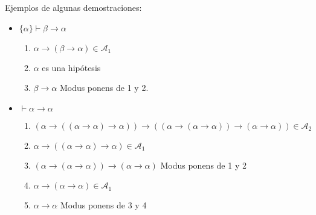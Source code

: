 \begin{ejemplo}
    Ejemplos de algunas demostraciones:
    \begin{itemize}
        \item $\{\alpha\}\vdash \beta\to\alpha$
            \begin{enumerate}
                \item $\alpha\to(\beta\to\alpha)\in \mathcal{A}_1$
                \item $\alpha$ es una hipótesis
                \item $\beta\to\alpha$ Modus ponens de 1 y 2.
            \end{enumerate}
        \item $\vdash \alpha\to\alpha$
            \begin{enumerate}
                \item $(\alpha\to((\alpha\to\alpha)\to\alpha))\to((\alpha\to(\alpha\to\alpha))\to(\alpha\to\alpha))\in \mathcal{A}_2$
                \item $\alpha\to((\alpha\to\alpha)\to\alpha)\in \mathcal{A}_1$
                \item $(\alpha\to(\alpha\to\alpha))\to(\alpha\to\alpha)$ Modus ponens de 1 y 2
                \item $\alpha\to(\alpha\to\alpha)\in \mathcal{A}_1$
                \item $\alpha\to\alpha$ Modus ponens de 3 y 4
            \end{enumerate}
    \end{itemize}
\end{ejemplo}

